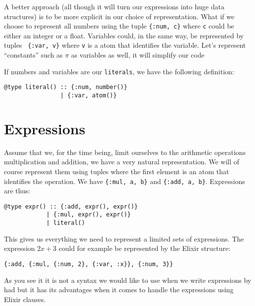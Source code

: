 \documentclass[a4paper,11pt]{article}
\begin{document}
A better approach (all though it will turn our expressions into huge
data structures) is to be more explicit in our choice of
representation. What if we choose to represent all numbers using the
tuple {\tt\{:num, c\}} where {\tt c} could be either an integer or a
float. Variables could, in the same way, be represented by tuples {\tt
  \{:var, v\}} where {\tt v} is a atom that identifies the
variable. Let's represent ``constants'' such as $\pi$ as variables as
well, it will simplify our code

If numbers and variables are our {\tt literals}, we have the
following definition:

\begin{verbatim}
@type literal() :: {:num, number()} 
                | {:var, atom()}
\end{verbatim}



\section{Expressions}

Assume that we, for the time being, limit ourselves to the arithmetic
operations multiplication and addition, we have a very natural
representation. We will of course represent them using tuples where
the first element is an atom that identifies the operation. We have
{\tt\{:mul, a, b\}} and {\tt \{:add, a, b\}}. Expressions are thus:

\begin{verbatim}
@type expr() :: {:add, expr(), expr()} 
            | {:mul, expr(), expr()} 
            | literal()
\end{verbatim}

This gives us everything we need to represent a limited sets of
expressions. The expression $2x + 3$ could for example be represented
by the Elixir structure:

\begin{verbatim}
{:add, {:mul, {:num, 2}, {:var, :x}}, {:num, 3}}
\end{verbatim}

\noindent As you see it it is not a syntax we would like to use when we write
expressions by had but it has its advantages when it comes to handle
the expressions using Elixir clauses. 


\end{document}
